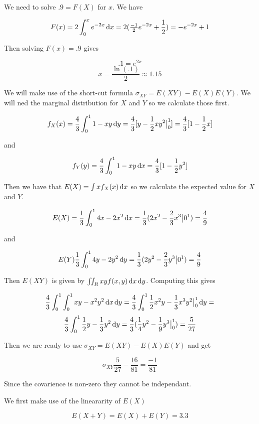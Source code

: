 \documentclass[11pt,largemargins]{homework}
\begin{document}
\maketitle

\question
We need to solve $.9 = F(X)$ for $x$. We have 

\[ F(x) = 2 \int_0^{x} e^{-2x} \dif x = 2(\tfrac{-1}{2}e^{-2x} + \frac{1}{2}) = -e^{-2x} + 1\]

Then solving $F(x) = .9$ gives 

\[ .1 = e^{2x} \]
\[x = \frac{\ln(.1)}{2} \approx 1.15\]

\newpage 

\question 
We will make use of the short-cut formula $\sigma_{XY} = E(XY) - E(X)E(Y)$. We will ned the marginal distribution 
for $X$ and $Y$ so we calculate those first. 

\[f_X(x) = \frac{4}{3}\int_0^1 1 - xy \dif y = \frac{4}{3}[y - \frac{1}{2}xy^2 \big|_0^1] = \frac{4}{3} [1 - \frac{1}{2}x] \] 

and 

\[f_Y(y) = \frac{4}{3} \int_0^1 1 - xy \dif x = \frac{4}{3}[1-\frac{1}{2}y^2]\]

Then we have that $E(X) = \int x f_X(x) \dif x$ so we calculate the expected value for $X$ and $Y$. 

\[E(X) = \frac{1}{3} \int_0^1 4x - 2x^2 \dif x = \frac{1}{3} (2x^2 - \frac{2}{3}x^3 \big|0^1) = \frac{4}{9} \]

and 

\[E(Y) \frac{1}{3} \int_0^1 4y - 2y^2 \dif y = \frac{1}{3} (2y^2 - \frac{2}{3}y^3 \big|0^1) = \frac{4}{9}\]

Then $E(XY)$ is given by $\iint_R xyf(x, y) \dif x \dif y$. Computing this gives 

\[\frac{4}{3} \int_0^1 \int_0^1 xy - x^2y^2 \dif x \dif y = \frac{4}{3}\int_0^1 \frac{1}{2}x^2y - \frac{1}{3}x^3y^2 \big|_0^1 \dif y =\]
\[\frac{4}{3} \int_0^1 \frac{1}{2}y - \frac{1}{3}y^2 \dif y = \frac{4}{3}(\frac{1}{4}y^2 - \frac{1}{9}y^3\big|_0^1) = \frac{5}{27}\]

Then we are ready to use $\sigma_{XY} = E(XY) - E(X)E(Y)$ and get 

\[\sigma_{XY} \frac{5}{27} - \frac{16}{81} = \frac{-1}{81}\]

Since the covarience is non-zero they cannot be independant. 

\newpage
\question
We first make use of the lineararity of $E(X)$ 

\[E(X + Y) = E(X)+E(Y) = 3.3\]
\end{document}
